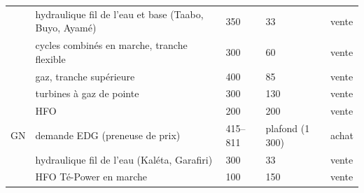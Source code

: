 \begin{longtable}{p{1.2cm}p{7.9cm}p{2.3cm}p{2.1cm}p{1.5cm}}
 & hydraulique fil de l'eau et base (Taabo, Buyo, Ayamé) & 350 & 33 & vente \\ \rowsep
 & cycles combinés en marche, tranche flexible & 300 & 60 & vente \\ \rowsep
 & gaz, tranche supérieure & 400 & 85 & vente \\ \rowsep
 & turbines à gaz de pointe & 300 & 130 & vente \\ \rowsep
 & HFO & 200 & 200 & vente \\ \rowsep
GN & demande EDG (preneuse de prix) & 415--811 & plafond (1\,300) & achat \\ \rowsep
 & hydraulique fil de l'eau (Kaléta, Garafiri) & 300 & 33 & vente \\ \rowsep
 & HFO Té-Power en marche & 100 & 150 & vente \\
\end{longtable}

